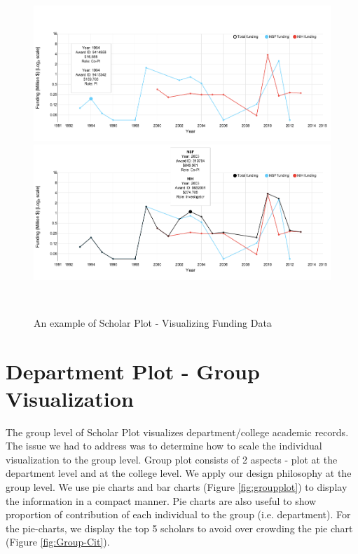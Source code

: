 \begin{figure}[!htb]
  \centering
  \includegraphics[width=1\textwidth]{figures/fig_funding_default}
  \includegraphics[width=1\textwidth]{figures/fig_funding_total}
  \caption{An example of Scholar Plot - Visualizing Funding Data}~\label{fig:funding}
\end{figure}






\section{Department Plot - Group Visualization}
The group level of Scholar Plot visualizes department/college academic records. The issue we had to address was to determine how to scale the individual visualization to the group level. Group plot consists of 2 aspects - plot at the department level and at the college level. We apply our design philosophy at the group level. We use pie charts and bar charts (Figure \ref{fig:groupplot}) to display the information in a compact manner. Pie charts are also useful to show proportion of contribution of each individual to the group (i.e. department). For the pie-charts, we display the top 5 scholars to avoid over crowding the pie chart (Figure \ref{fig:Group-Cit}).

